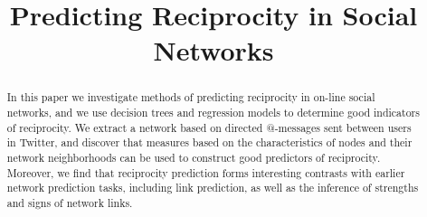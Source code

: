 \documentclass[conference]{IEEEtran}
\begin{document}
\title{Predicting Reciprocity in Social Networks}

\author{
\and
{}
\and
{}
\and
{}
}

\maketitle

\begin{abstract}
In this paper we investigate methods of predicting reciprocity in
on-line social networks, and we use decision trees and regression models to
determine good indicators of reciprocity.  
We extract a network based
on directed @-messages sent between users in Twitter, and discover
that measures based on the characteristics of nodes and their
network neighborhoods can be used to construct good predictors
of reciprocity.
Moreover, we find that reciprocity prediction forms interesting
contrasts with earlier network prediction tasks, including
link prediction, as well as the inference of strengths and signs
of network links.
\end{abstract}


%
\IEEEpeerreviewmaketitle
\end{document}
